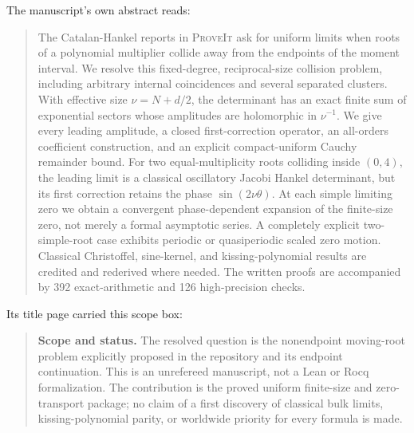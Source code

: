 \documentclass[11pt,a4paper]{article}
\numberwithin{equation}{section}
\theoremstyle{definition}
\theoremstyle{remark}
\begin{document}
The manuscript's own abstract reads:
\begin{quote}\small
The Catalan-Hankel reports in \textsc{ProveIt} ask for uniform limits when
roots of a polynomial multiplier collide away from the endpoints of the
moment interval. We resolve this fixed-degree, reciprocal-size collision
problem, including arbitrary internal coincidences and several separated
clusters. With effective size $\nu=N+d/2$, the determinant has an exact
finite sum of exponential sectors whose amplitudes are holomorphic in
$\nu^{-1}$. We give every leading amplitude, a closed first-correction
operator, an all-orders coefficient construction, and an explicit
compact-uniform Cauchy remainder bound. For two equal-multiplicity roots
colliding inside $(0,4)$, the leading limit is a classical oscillatory
Jacobi Hankel determinant, but its first correction retains the phase
$\sin(2\nu\theta)$. At each simple limiting zero we obtain a convergent
phase-dependent expansion of the finite-size zero, not merely a formal
asymptotic series. A completely explicit two-simple-root case exhibits
periodic or quasiperiodic scaled zero motion. Classical Christoffel,
sine-kernel, and kissing-polynomial results are credited and rederived
where needed. The written proofs are accompanied by 392 exact-arithmetic
and 126 high-precision checks.
\end{quote}
Its title page carried this scope box:
\begin{quote}\small
\textbf{Scope and status.} The resolved question is the nonendpoint
moving-root problem explicitly proposed in the repository and its
endpoint continuation. This is an unrefereed manuscript, not a Lean or
Rocq formalization. The contribution is the proved uniform finite-size
and zero-transport package; no claim of a first discovery of classical
bulk limits, kissing-polynomial parity, or worldwide priority for every
formula is made.
\end{quote}
\end{document}
